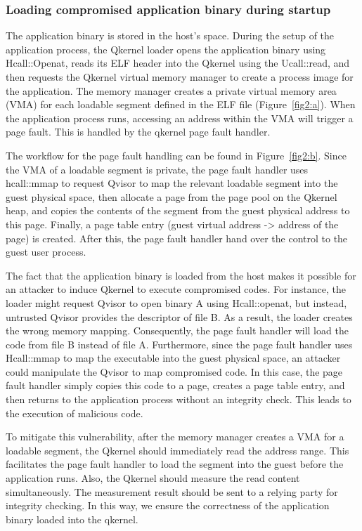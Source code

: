 \subsubsection{Loading compromised application binary during startup}
\label{sec:app_binary_loading}
The application binary is stored in the host’s space. During the setup of the application process, the Qkernel loader opens the application binary using Hcall::Openat, reads its ELF header into the Qkernel using the Ucall::read, and then requests 
the Qkernel virtual memory manager to create a process image for the application. The memory manager creates a private virtual memory area (VMA) for each loadable segment defined in the ELF file  (Figure~\ref{fig2:a}). When the application process 
runs, accessing an address within the VMA will trigger a page fault. This is handled by the qkernel page fault handler. 

The workflow for the page fault handling can be found in Figure~\ref{fig2:b}. Since the VMA of a loadable segment is private, the page fault handler uses hcall::mmap to request Qvisor to map the relevant loadable segment into the guest physical space, 
then allocate a page from the page pool on the Qkernel heap, and copies the contents of the segment from the guest physical address to this page. Finally, a page table entry (guest virtual address -> address of the page) is created. After this, 
the page fault handler hand over the control to the guest user process. 

The fact that the application binary is loaded from the host makes it possible for an attacker to induce Qkernel to execute compromised codes. For instance, the loader might request Qvisor to open binary A using Hcall::openat, but instead, 
untrusted Qvisor provides the descriptor of file B. As a result, the loader creates the wrong memory mapping. Consequently, the page fault handler will load the code from file B instead of file A. Furthermore, since the page fault handler uses 
Hcall::mmap to map the executable into the guest physical space, an attacker could manipulate the Qvisor to map compromised code. In this case, the page fault handler simply copies this code to a page, creates a page table entry, and then returns 
to the application process without an integrity check. This leads to the execution of malicious code. 

To mitigate this vulnerability, after the memory manager creates a VMA for a loadable segment, the Qkernel should immediately read the address range. This facilitates the page fault handler to load the segment into the guest before the application 
runs. Also, the Qkernel should measure the read content simultaneously. The measurement result should be sent to a relying party for integrity checking. In this way, we ensure the correctness of the application binary loaded into the qkernel.



